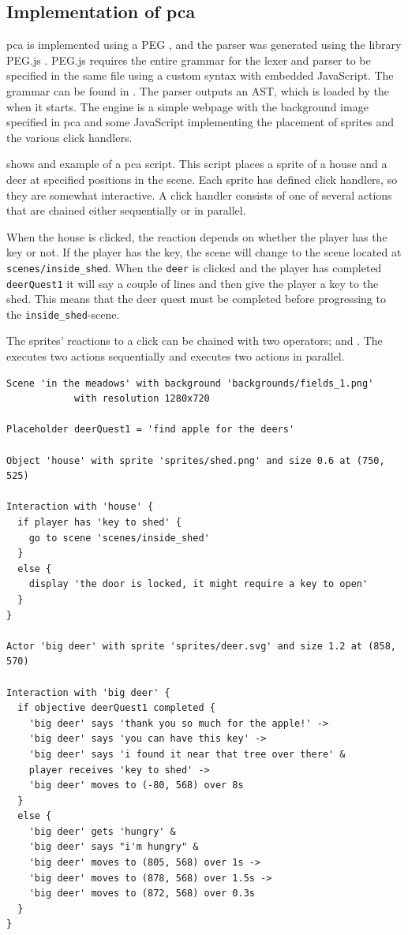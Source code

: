\subsection{Implementation of pca}
pca is implemented using a \ac{PEG} \cite{ford2004parsing}, and the parser was generated using the library PEG.js \cite{peg:js}. PEG.js requires the entire grammar for the lexer and parser to be specified in the same file using a custom syntax with embedded JavaScript. The grammar can be found in . The parser outputs an \ac{AST}, which is loaded by the  when it starts. The engine is a simple webpage with the background image specified in pca and some JavaScript implementing the placement of sprites and the various click handlers.

 shows and example of a pca script. This script places a sprite of a house and a deer at specified positions in the scene. Each sprite has defined click handlers, so they are somewhat interactive. A click handler consists of one of several actions that are chained either sequentially or in parallel.

When the house is clicked, the reaction depends on whether the player has the key or not. If the player has the key, the scene will change to the scene located at \texttt{scenes/inside\_shed}.
When the \texttt{deer} is clicked and the player has completed \texttt{deerQuest1} it will say a couple of lines and then give the player a key to the shed. This means that the deer quest must be completed before progressing to the \texttt{inside\_shed}-scene.

The sprites' reactions to a click can be chained with two operators; \ttt{-\textgreater} and \ttt{\&}. The \ttt{-\textgreater} executes two actions sequentially and \ttt{\&} executes two actions in parallel. 

\begin{lstlisting}[caption={pca script to place a house and a deer sprite}, label={lst:pca:script}]
Scene 'in the meadows' with background 'backgrounds/fields_1.png' 
            with resolution 1280x720

Placeholder deerQuest1 = 'find apple for the deers'

Object 'house' with sprite 'sprites/shed.png' and size 0.6 at (750, 525)

Interaction with 'house' {
  if player has 'key to shed' {
    go to scene 'scenes/inside_shed'
  }
  else {
    display 'the door is locked, it might require a key to open'
  }
}

Actor 'big deer' with sprite 'sprites/deer.svg' and size 1.2 at (858, 570)

Interaction with 'big deer' {
  if objective deerQuest1 completed {
    'big deer' says 'thank you so much for the apple!' ->
    'big deer' says 'you can have this key' ->
    'big deer' says 'i found it near that tree over there' &
    player receives 'key to shed' ->
    'big deer' moves to (-80, 568) over 8s
  }
  else {
    'big deer' gets 'hungry' &
    'big deer' says "i'm hungry" &
    'big deer' moves to (805, 568) over 1s ->
    'big deer' moves to (878, 568) over 1.5s ->
    'big deer' moves to (872, 568) over 0.3s
  }
}
\end{lstlisting}

